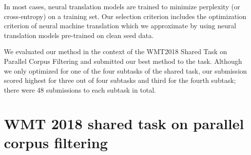 \documentclass[11pt,a4paper]{article}
\begin{document}
In most cases, neural translation models are trained to minimize perplexity (or cross-entropy) on a training set. Our selection criterion includes the optimization criterion of neural machine translation which we approximate by using neural translation models pre-trained on clean seed data. %

We evaluated our method in the context of the WMT2018 Shared Task on Parallel Corpus Filtering \cite{parallel-filtering-task:2018:WMT} and submitted our best method to the task. Although we only optimized for one of the four subtasks of the shared task, our submission scored highest for three out of four subtasks and third for the fourth subtask; there were 48 submissions to each subtask in total. 






\section{WMT 2018 shared task on parallel corpus filtering}
\end{document}
